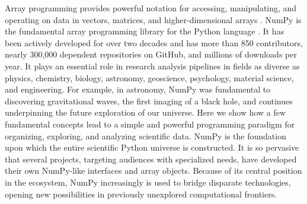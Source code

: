 




Array programming provides powerful notation for accessing,
manipulating, and operating on data in vectors, matrices, and
higher-dimensional arrays \cite{iverson1980notation}.
NumPy is the fundamental array programming library for the Python language
\cite{dubois2007guest,oliphant2007python,millman2011python,perez2011python}.
It has been actively developed for over two decades and has more than 850
contributors, nearly 300,000 dependent repositories on GitHub, and millions of
downloads per year.
It plays an essential role in research analysis pipelines in fields as
diverse as physics, chemistry, biology, astronomy, geoscience, psychology,
material science, and engineering.
For example, in astronomy, NumPy was fundamental to discovering gravitational
waves\cite{pycbc}, the first imaging of a black hole\cite{eht-imaging}, and
continues underpinning the future exploration of our
universe\cite{jenness2018lsst}.
Here we show how a few fundamental concepts lead to a simple and
powerful programming paradigm for organizing, exploring, and analyzing
scientific data.
NumPy is the foundation upon which the entire scientific Python
universe is constructed. It is so pervasive that several projects,
targeting audiences with specialized needs, have developed their own
NumPy-like interfaces and array objects.  Because of its central position in the
ecosystem, NumPy increasingly is used to bridge disparate
technologies, opening new possibilities in previously unexplored computational frontiers.

